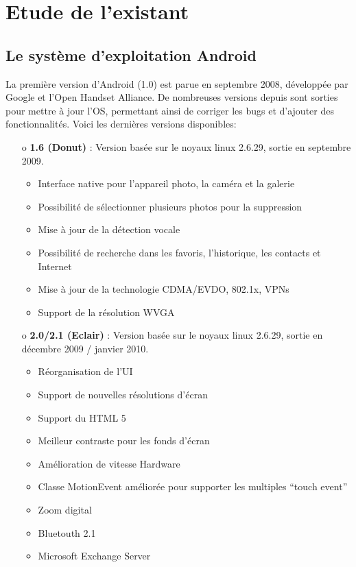 \chapter{Etude de l'existant}
\section{Le système d'exploitation Android}La première version d'Android (1.0)
est parue en septembre 2008, développée par Google et l'Open Handset Alliance.
De nombreuses versions depuis sont sorties pour mettre à jour l'OS,
permettant ainsi de corriger les bugs et d'ajouter des fonctionnalités. Voici les dernières versions disponibles:
\newline
\begin{itemize}
  \item[o] \textbf{1.6 (Donut)} :
  Version basée sur le noyaux linux 2.6.29, sortie en septembre 2009.
  \begin{itemize}
    \item Interface native pour l'appareil photo, la caméra et la galerie
    \item Possibilité de sélectionner plusieurs photos pour la suppression
    \item Mise à jour de la détection vocale
    \item Possibilité de recherche dans les favoris, l'historique, les
    contacts et Internet
    \item Mise à jour de la technologie CDMA/EVDO, 802.1x, VPNs
    \item Support de la résolution WVGA
    \newline
  \end{itemize}
  
  
  \item[o] \textbf{2.0/2.1 (Eclair)} :
  Version basée sur le noyaux linux 2.6.29, sortie en décembre 2009 / janvier
  2010.
  \begin{itemize}
    \item Réorganisation de l'UI
    \item Support de nouvelles résolutions d'écran
    \item Support du HTML 5
    \item Meilleur contraste pour les fonds d'écran
    \item Amélioration de vitesse Hardware
    \item Classe MotionEvent améliorée pour supporter les multiples ``touch
    event''
    \item Zoom digital
    \item Bluetouth 2.1
    \item Microsoft Exchange Server
    \newline
  \end{itemize}
  

\end{itemize}
